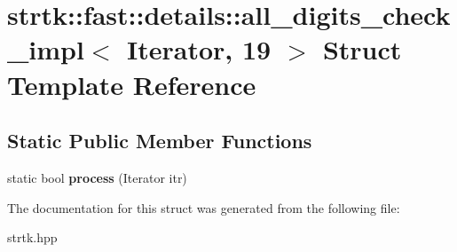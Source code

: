 \hypertarget{structstrtk_1_1fast_1_1details_1_1all__digits__check__impl_3_01Iterator_00_0119_01_4}{\section{strtk\-:\-:fast\-:\-:details\-:\-:all\-\_\-digits\-\_\-check\-\_\-impl$<$ Iterator, 19 $>$ Struct Template Reference}
\label{structstrtk_1_1fast_1_1details_1_1all__digits__check__impl_3_01Iterator_00_0119_01_4}
}
\subsection*{Static Public Member Functions}
\begin{DoxyCompactItemize}
\item 
\hypertarget{structstrtk_1_1fast_1_1details_1_1all__digits__check__impl_3_01Iterator_00_0119_01_4_af6aad0599a8de1f80c562a0af75851a5}{static bool {\bfseries process} (Iterator itr)}\label{structstrtk_1_1fast_1_1details_1_1all__digits__check__impl_3_01Iterator_00_0119_01_4_af6aad0599a8de1f80c562a0af75851a5}

\end{DoxyCompactItemize}


The documentation for this struct was generated from the following file\-:\begin{DoxyCompactItemize}
\item 
strtk.\-hpp\end{DoxyCompactItemize}
